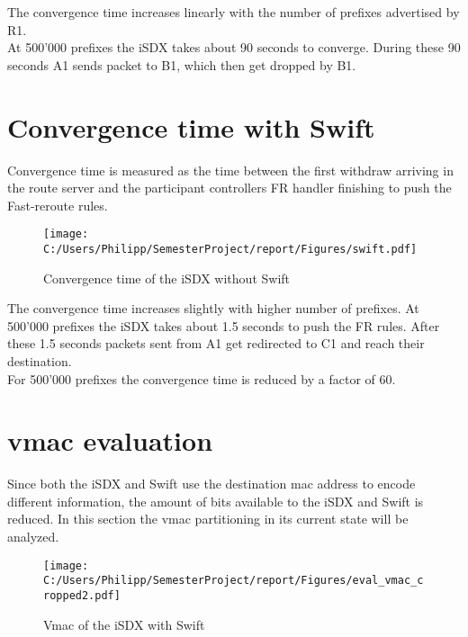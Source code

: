 \newpage

The convergence time increases linearly with the number of prefixes advertised by R1. \\
At 500'000 prefixes the iSDX takes about 90 seconds to converge. During these 90 seconds A1 sends packet to B1, which then get dropped by B1. 

\section{\label{chapter4:Convergence time with Swift}Convergence time with Swift}

Convergence time is measured as the time between the first withdraw arriving in the route server and the participant controllers FR handler finishing to push the Fast-reroute rules. \\

\begin{figure}[h]
\center
\texttt{[image: C:/Users/Philipp/SemesterProject/report/Figures/swift.pdf]}
\caption{Convergence time of the iSDX without Swift}
\end{figure}

The convergence time increases slightly with higher number of prefixes. At 500'000 prefixes the iSDX takes about 1.5 seconds to push the FR rules. After these 1.5 seconds packets sent from A1 get redirected to C1 and reach their destination. \\
For 500'000 prefixes the convergence time is reduced by a factor of 60.


\newpage

\section{\label{chapter4:vmac evaluation}vmac evaluation}

Since both the iSDX and Swift use the destination mac address to encode different information, the amount of bits available to  the iSDX and Swift is reduced. In this section the vmac partitioning in its current state will be analyzed.

\begin{figure}[h]
\center
\texttt{[image: C:/Users/Philipp/SemesterProject/report/Figures/eval\_vmac\_cropped2.pdf]}
\caption{Vmac of the iSDX with Swift}
\end{figure}

